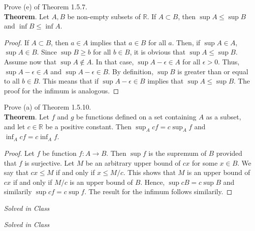 \documentclass[12pt]{book}
\newenvironment{exercise}[2][Exercise]{\begin{trivlist}
\item[\hskip \labelsep {\bfseries #1}\hskip \labelsep {\bfseries #2.}]}{\end{trivlist}}
\begin{document}
\begin{exercise}{1.5.7}
Prove (e) of Theorem 1.5.7. \\

\textbf{Theorem}. Let $A,B$ be non-empty subsets of $\mathbb{R}$. If $A \subset B$, then $\sup A \leq \sup B$ and $\inf B \leq \inf A$.
	\begin{proof}
	If $A \subset B$, then $a \in A$ implies that $a \in B$ for all $a$. Then, if $\sup A \in A$, $\sup A \in B$. Since $\sup B \geq b$ for all $b \in B$, it is obvious that $\sup A \leq \sup B$. Assume now that $\sup A \notin A$. In that case, $\sup A - \epsilon \in A$ for all $\epsilon > 0$. Thus, $\sup A - \epsilon \in A$ and $\sup A - \epsilon \in B$. By definition, $\sup B$ is greater than or equal to all $b \in B$. This means  that if $\sup A - \epsilon \in B$ implies that $\sup A \leq \sup B$. The proof for the infimum is analogous.
	\end{proof}
\end{exercise}

\begin{exercise}{1.5.10}
Prove (a) of Theorem 1.5.10. \\

\textbf{Theorem}. Let $f$ and $g$ be functions defined on a set containing $A$ as a subset, and let $c \in \mathbb{R}$ be a positive constant. Then $\sup_A c f= c \sup_A f$ and $\inf_A c f = c \inf_A f$.
	\begin{proof}
	Let $f$ be function $f: A \to B$. Then $\sup f$ is the supremum of $B$ provided that $f$ is surjective. Let $M$ be an arbitrary upper bound of $cx$ for some $x \in B$. We say that $c x \leq M$ if and only if $x \leq M/c$. This shows that $M$ is an upper bound of $c x$ if and only if $M/c$ is an upper bound of $B$. Hence, $\sup c B = c \sup B$ and similarily $\sup c f = c \sup f$. The result for the infimum follows similarily.
	\end{proof}
\end{exercise}

\begin{exercise}{1.5.8}
\emph{Solved in Class}
\end{exercise}

\begin{exercise}{1.5.9}
\emph{Solved in Class}
\end{exercise}
\end{document}
